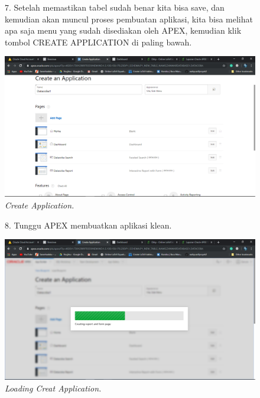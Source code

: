 \begin{enumerate}
    \begin{figure}[!htbp]
    \item[7.] Setelah memastikan tabel sudah benar kita bisa save, dan kemudian akan muncul proses pembuatan aplikasi, kita bisa melihat apa saja menu yang sudah disediakan oleh APEX, kemudian klik tombol CREATE APPLICATION di paling bawah.
    \begin{center}
    \includegraphics[scale=0.3]{figures/Screenshot(95).png}
    \caption{\textit{Create Application.}}
    \end{center}   
    \end{figure}
    
    \begin{figure}[!htbp]
    \item[8.] Tunggu APEX membuatkan aplikasi klean.
    \begin{center}
    \includegraphics[scale=0.3]{figures/Screenshot(102).png}
    \caption{\textit{Loading Creat Application.}}
    \end{center}   
    \end{figure}
    

\end{enumerate}
